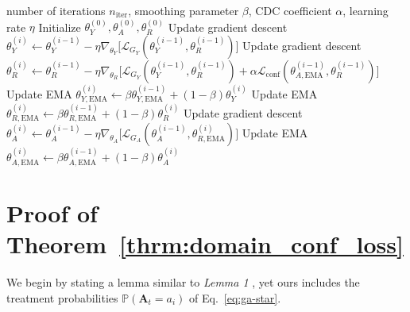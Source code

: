 \documentclass{article}
\theoremstyle{plain}
\theoremstyle{definition}
\theoremstyle{remark}
\newcommand{\shortname}{CT\xspace}
\begin{document}
\begin{algorithm}[htb]
  \caption{ Adversarial training in \shortname via iterative gradient descent}
  \label{alg:grad-desc-ema}
    \begin{algorithmic}
       number of iterations $n_{\text{iter}}$, smoothing parameter $\beta$, CDC coefficient $\alpha$, learning rate $\eta$
      \STATE Initialize $\theta_Y^{(0)}, \theta_A^{(0)}, \theta_R^{(0)}$
      \STATE Update gradient descent $\theta_Y^{(i)} \gets \theta_Y^{(i-1)} - \eta \nabla_{\theta_Y} \big[ \mathcal{L}_{G_Y} (\theta_Y^{(i-1)}, \theta_R^{(i-1)}) \big]$
      \STATE Update gradient descent $\theta_R^{(i)} \gets \theta_R^{(i-1)} - \eta \nabla_{\theta_R} \big[ \mathcal{L}_{G_Y} (\theta_Y^{(i-1)}, \theta_R^{(i-1)}) + \alpha \mathcal{L}_{\text{conf}} (\theta_{A, \text{EMA}}^{(i-1)}, \theta_R^{(i-1)}) \big]$
      \STATE Update EMA $\theta_{Y, \text{EMA}}^{(i)} \gets \beta  \theta^{(i - 1)}_{Y, \text{EMA}} + (1 - \beta) \theta_{Y}^{(i)}$
      \STATE Update EMA $\theta_{R, \text{EMA}}^{(i)} \gets \beta  \theta^{(i - 1)}_{R, \text{EMA}} + (1 - \beta) \theta_R^{(i)}$
      \STATE Update gradient descent $\theta_A^{(i)} \gets \theta_A^{(i-1)} - \eta \nabla_{\theta_A} \big[ \mathcal{L}_{G_A} (\theta_A^{(i-1)}, \theta_{R, \text{EMA}}^{(i)}) \big]$
      \STATE Update EMA $\theta_{A, \text{EMA}}^{(i)} \gets \beta  \theta^{(i - 1)}_{A, \text{EMA}} + (1 - \beta) \theta_A^{(i)}$
      \ENDFOR
    \end{algorithmic}
\end{algorithm}

\clearpage
\section{Proof of Theorem~\ref{thrm:domain_conf_loss}}  \label{app:proof}

We begin by stating a lemma similar to \emph{Lemma 1} \cite{bica2020estimating}, yet ours includes the treatment probabilities $\mathbb{P}(\mathbf{A}_t = a_i)$ of Eq.~\eqref{eq:ga-star}.
\end{document}
